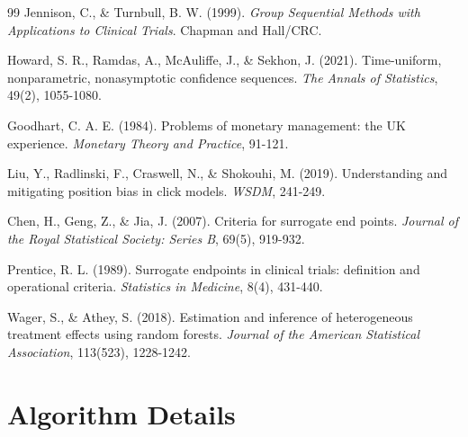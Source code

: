\documentclass[11pt,twocolumn]{article}
\begin{document}
\begin{thebibliography}{99}
Jennison, C., \& Turnbull, B. W. (1999).
\textit{Group Sequential Methods with Applications to Clinical Trials}.
Chapman and Hall/CRC.

Howard, S. R., Ramdas, A., McAuliffe, J., \& Sekhon, J. (2021).
Time-uniform, nonparametric, nonasymptotic confidence sequences.
\textit{The Annals of Statistics}, 49(2), 1055-1080.

Goodhart, C. A. E. (1984).
Problems of monetary management: the UK experience.
\textit{Monetary Theory and Practice}, 91-121.

Liu, Y., Radlinski, F., Craswell, N., \& Shokouhi, M. (2019).
Understanding and mitigating position bias in click models.
\textit{WSDM}, 241-249.

Chen, H., Geng, Z., \& Jia, J. (2007).
Criteria for surrogate end points.
\textit{Journal of the Royal Statistical Society: Series B}, 69(5), 919-932.

Prentice, R. L. (1989).
Surrogate endpoints in clinical trials: definition and operational criteria.
\textit{Statistics in Medicine}, 8(4), 431-440.

Wager, S., \& Athey, S. (2018).
Estimation and inference of heterogeneous treatment effects using random forests.
\textit{Journal of the American Statistical Association}, 113(523), 1228-1242.

\end{thebibliography}

\appendix

\section{Algorithm Details}
\end{document}
